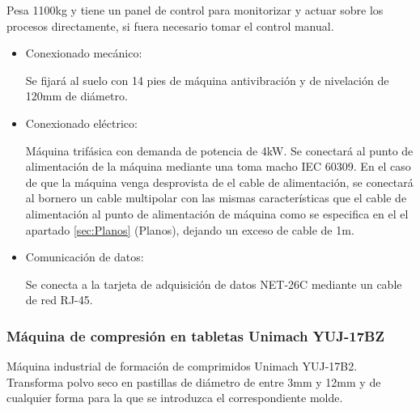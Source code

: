 	Pesa 1100kg y tiene un panel de control para monitorizar y actuar sobre los procesos directamente, si fuera necesario tomar el control manual.

		\begin{itemize}
				\item{Conexionado mecánico:}
				
				Se fijará al suelo con 14 pies de máquina antivibración y de nivelación de 120mm de diámetro.

				\item{Conexionado eléctrico:}

				Máquina trifásica con demanda de potencia de 4kW. Se conectará al punto de alimentación de la máquina mediante una  toma macho IEC 60309. En el caso de que la máquina venga desprovista de el cable de alimentación, se conectará al bornero un cable multipolar con las mismas características que el cable de alimentación al punto de alimentación de máquina como se especifica en el el apartado \ref{sec:Planos} (Planos), dejando un exceso de cable de 1m. \
				
				\item{Comunicación de datos:}

				Se conecta a la tarjeta de adquisición de datos NET-26C mediante un cable de red RJ-45.
				
		\end{itemize}

	\newpage

	\subsubsection{Máquina de compresión en tabletas Unimach YUJ-17BZ}

	

	Máquina industrial de formación de comprimidos Unimach YUJ-17B2. Transforma polvo seco en pastillas de diámetro de entre 3mm y 12mm y de cualquier forma para la que se introduzca el correspondiente molde.\\

